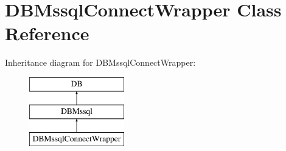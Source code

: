 \hypertarget{classDBMssqlConnectWrapper}{\section{D\+B\+Mssql\+Connect\+Wrapper Class Reference}
\label{classDBMssqlConnectWrapper}
}


 


Inheritance diagram for D\+B\+Mssql\+Connect\+Wrapper\+:\begin{figure}[H]
\begin{center}
\leavevmode
\includegraphics[height=3.000000cm]{classDBMssqlConnectWrapper}
\end{center}
\end{figure}
